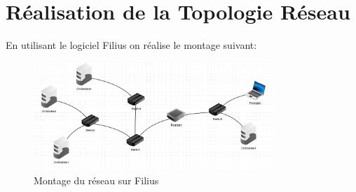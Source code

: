\documentclass[11pt]{book}
\begin{document}
	

	

	\section{Réalisation de la Topologie Réseau}

	En utilisant le logiciel Filius on réalise le montage suivant:
	\begin{figure}[ht!]
		\centering
		\includegraphics[width=0.8\textwidth]{./object/g1.png}
		\caption{Montage du réseau sur Filius}
	\end{figure}
\end{document}
